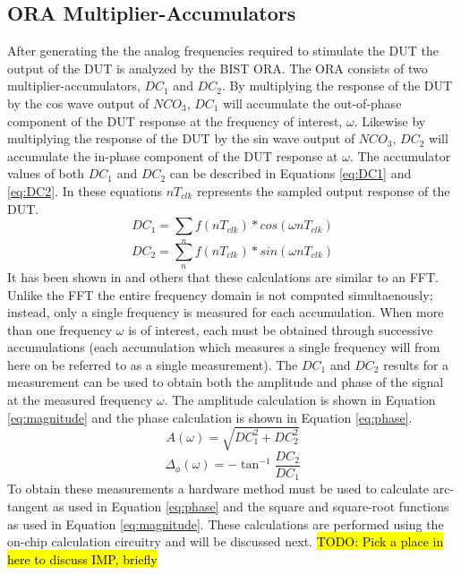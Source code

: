 \documentclass[12pt]{report}
\newcommand{\todo}[1]{\hl{TODO: #1}}
\begin{document}
\subsection{ORA Multiplier-Accumulators}
\label{sct:bist-ora}
After generating the the analog frequencies required to stimulate the DUT the output of the DUT is analyzed by the BIST ORA.  The ORA consists of two multiplier-accumulators, $DC_1$ and $DC_2$\cite{bist-ora}.  By multiplying the response of the DUT by the cos wave output of $NCO_3$, $DC_1$ will accumulate the out-of-phase component of the DUT response at the frequency of interest, $\omega$.  Likewise by multiplying the response of the DUT by the sin wave output of $NCO_3$, $DC_2$ will accumulate the in-phase component of the DUT response at $\omega$.  The accumulator values of both $DC_1$ and $DC_2$ can be described in Equations \ref{eq:DC1} and \ref{eq:DC2}. In these equations $nT_{clk}$ represents the sampled output response of the DUT\cite{stroud-phase}.  
\begin{equation}
DC_1 = \sum_{n} f(nT_{clk})*cos(\omega nT_{clk})
\label{eq:DC1}
\end{equation}
\begin{equation}
DC_2 = \sum_{n} f(nT_{clk})*sin(\omega nT_{clk})
\label{eq:DC2}
\end{equation}
It has been shown in \cite{jie}\cite{stroud-phase} and others that these calculations are similar to an FFT.  Unlike the FFT the entire frequency domain is not computed simultaenously; instead,  only a single frequency is measured for each accumulation\cite{stroud-phase}.  When more than one frequency $\omega$ is of interest, each must be obtained through successive accumulations (each accumulation which measures a single frequency will from here on be referred to as a single measurement).  The $DC_1$ and $DC_2$ results for a measurement can be used to obtain both the amplitude and phase of the signal at the measured frequency $\omega$.  The amplitude calculation is shown in Equation \ref{eq:magnitude} and the phase calculation is shown in Equation \ref{eq:phase}\cite{jie}.
\begin{equation}
  A(\omega) = \sqrt{DC_1^2+DC_2^2}
  \label{eq:magnitude}
\end{equation}
\begin{equation}
  \Delta_\phi(\omega) = -\tan^{-1}\frac{DC_2}{DC_1}
  \label{eq:phase}
\end{equation}
To obtain these measurements a hardware method must be used to calculate arc-tangent as used in Equation \ref{eq:phase} and the square and square-root functions as used in Equation \ref{eq:magnitude}.  These calculations are performed using the on-chip calculation circuitry and will be discussed next.
\todo{Pick a place in here to discuss IMP, briefly}
\end{document}
